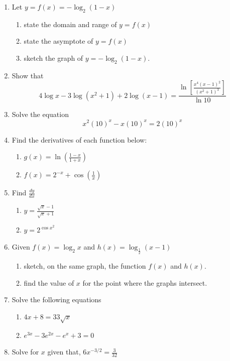 \documentclass[11pt,a4paper]{article}
\theoremstyle{definition}
\begin{document}
\begin{enumerate}
\item Let $y=f(x)=-\log_2(1-x)$
\begin{enumerate}
       \item state the domain and range of $y=f(x)$
       \item state the asymptote of $y=f(x)$
       \item sketch the graph of $y=-\log_2(1-x)$.
\end{enumerate}

\item Show that $$4\log x-3\log (x^2+1)+2\log (x-1) = \frac{\ln \left[\frac{x^4(x-1)^2}{(x^2+1)^3}\right]}{\ln 10}$$

\item Solve the equation $$x^2 (10)^x-x(10)^x=2(10)^x$$

\item Find the derivatives of each function below:
\begin{enumerate}
     \item $g(x)=\ln\left(\frac{1-x}{1+x}\right)$
     \item $f(x)=2^{\displaystyle{-x}}+\cos \left(\frac{1}{x}\right)$
\end{enumerate}

\item Find $\frac{dy}{dx}$
\begin{enumerate}
      \item $y=\frac{\sqrt{x}-1}{\sqrt{x}+1}$
      \item $y=2^{\displaystyle{\cos x^{\displaystyle{2}}}}$
\end{enumerate}

\item Given $f(x)=\log_{2}x$ and $h(x)=\log_{\frac{1}{2}}(x-1)$
\begin{enumerate}
     \item sketch, on the same graph, the function $f(x)$ and $h(x)$.
     \item find the value of $x$ for the point where the graphs intersect.       
\end{enumerate}

\item Solve the following equations
\begin{enumerate}
      \item $4x+8=33\sqrt{x}$
      \item $e^{3x}-3e^{2x}-e^x+3=0$
\end{enumerate}

\item Solve for $x$ given that, $6x^{-3/2}=\frac{3}{32}$\\
\end{enumerate}
\end{document}
